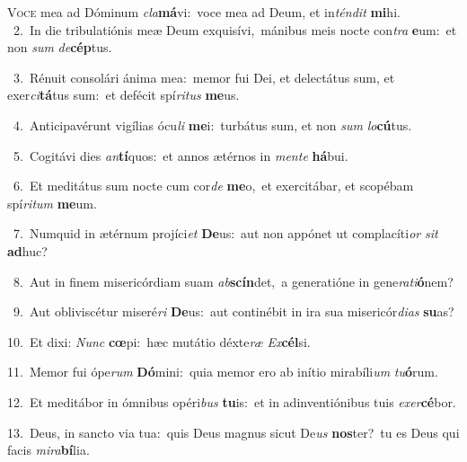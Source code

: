 \lettrine{\initial\textcolor{\initialcolor}{V}}{oce} mea ad Dóminum \textit{cla}\-\textbf{má}vi:~\star voce mea ad Deum, et in\-\textit{tén}\-\textit{dit} \textbf{mi}\-hi.\\
{\numbfont\textcolor{\numbcolor}{~2.}}~In die tribulatiónis meæ Deum exquisívi,~\dagger mánibus meis nocte con\textit{tra} \textbf{e}\-um:~\star et non \textit{sum} \textit{de}\-\textbf{cép}tus.\par
{\numbfont\textcolor{\numbcolor}{~3.}}~Rénuit consolári ánima mea:~\dagger memor fui Dei, et delectátus sum, et exer\-\textit{ci}\-\textbf{tá}tus sum:~\star et defécit spí\-\textit{ri}\-\textit{tus} \textbf{me}\-us.\par
{\numbfont\textcolor{\numbcolor}{~4.}}~Anticipavérunt vigílias ócu\textit{li} \textbf{me}\-i:~\star turbátus sum, et non \textit{sum} \textit{lo}\-\textbf{cú}tus.\par
{\numbfont\textcolor{\numbcolor}{~5.}}~Cogitávi dies \textit{an}\-\textbf{tí}quos:~\star et annos ætérnos in \textit{men}\-\textit{te} \textbf{há}\-bui.\par
{\numbfont\textcolor{\numbcolor}{~6.}}~Et meditátus sum nocte cum cor\textit{de} \textbf{me}\-o,~\star et exercitábar, et scopébam spí\-\textit{ri}\-\textit{tum} \textbf{me}\-um.\par
{\numbfont\textcolor{\numbcolor}{~7.}}~Numquid in ætérnum projíci\textit{et} \textbf{De}\-us:~\star aut non appónet ut complacíti\textit{or} \textit{sit} \textbf{ad}\-huc?\par
{\numbfont\textcolor{\numbcolor}{~8.}}~Aut in finem misericórdiam suam \textit{ab}\-\textbf{scín}det,~\star a generatióne in gene\-\textit{ra}\-\textit{ti}\textbf{ó}nem?\par
{\numbfont\textcolor{\numbcolor}{~9.}}~Aut obliviscétur miseré\textit{ri} \textbf{De}\-us:~\star aut continébit in ira sua misericór\-\textit{di}\-\textit{as} \textbf{su}\-as?\par
{\numbfont\textcolor{\numbcolor}{10.}}~Et dixi: \textit{Nunc} \textbf{cœ}\-pi:~\star hæc mutátio déxte\textit{ræ} \textit{Ex}\-\textbf{cél}si.\par
{\numbfont\textcolor{\numbcolor}{11.}}~Memor fui ópe\textit{rum} \textbf{Dó}\-mini:~\star quia memor ero ab inítio mirabíli\textit{um} \textit{tu}\-\textbf{ó}rum.\par
{\numbfont\textcolor{\numbcolor}{12.}}~Et meditábor in ómnibus opéri\textit{bus} \textbf{tu}\-is:~\star et in adinventiónibus tuis \textit{ex}\-\textit{er}\textbf{cé}bor.\par
{\numbfont\textcolor{\numbcolor}{13.}}~Deus, in sancto via tua:~\dagger quis Deus magnus sicut De\textit{us} \textbf{nos}\-ter?~\star tu es Deus qui facis \textit{mi}\-\textit{ra}\textbf{bí}lia.\par
